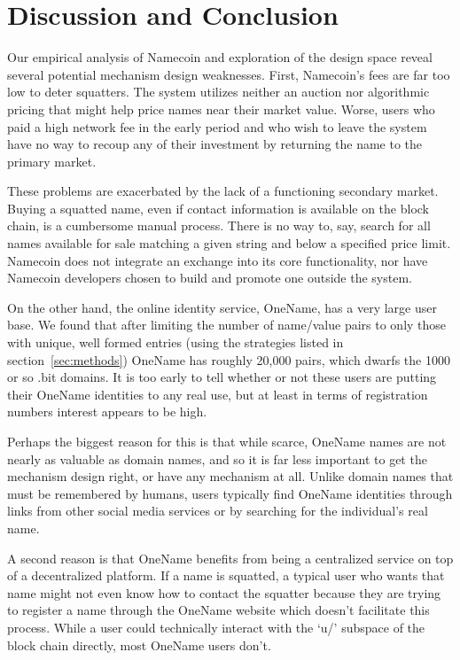 \section{Discussion and Conclusion}
\label{sec:conclusion}

Our empirical analysis of Namecoin and exploration of the design space reveal several potential mechanism design weaknesses. First, Namecoin's fees are far too low to deter squatters. The system utilizes neither an auction nor algorithmic pricing that might help price names near their market value. Worse, users who paid a high network fee in the early period and who wish to leave the system have no way to recoup any of their investment by returning the name to the primary market.

These problems are exacerbated by the lack of a functioning secondary market. Buying a squatted name, even if contact information is available on the block chain, is a cumbersome manual process. There is no way to, say, search for all names available for sale matching a given string and below a specified price limit. Namecoin does not integrate an exchange into its core functionality, nor have Namecoin developers chosen to build and promote one outside the system.

On the other hand, the online identity service, OneName, has a very large user base. We found that after limiting the number of name/value pairs to only those with unique, well formed entries (using the strategies listed in section~\ref{sec:methods}) OneName has roughly 20,000 pairs, which dwarfs the 1000 or so .bit domains. It is too early to tell whether or not these users are putting their OneName identities to any real use, but at least in terms of registration numbers interest appears to be high.

Perhaps the biggest reason for this is that while scarce, OneName names are not nearly as valuable as domain names, and so it is far less important to get the mechanism design right, or have any mechanism at all. Unlike domain names that must be remembered by humans, users typically find OneName identities through links from other social media services or by searching for the individual's real name.

A second reason is that OneName benefits from being a centralized service on top of a decentralized platform. If a name is squatted, a typical user who wants that name might not even know how to contact the squatter because they are trying to register a name through the OneName website which doesn't facilitate this process. While a user could technically interact with the `u/' subspace of the block chain directly, most OneName users don't.

